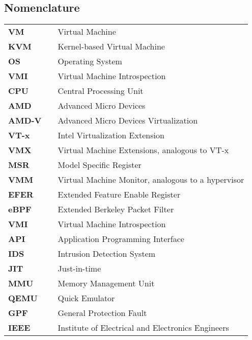 \documentclass{report}
\begin{document}
\begin{spacing}{1.5}
{}
\lstlistoflistings




\chapter*{Nomenclature}

\begin{longtable}{lcl}
\large{\bf VM}  & & \large{Virtual Machine} \\
\large{\bf KVM}  & & \large{Kernel-based Virtual Machine} \\
\large{\bf OS}   & & \large{Operating System}        \\
\large{\bf VMI}  & & \large{Virtual Machine Introspection} \\
\large{\bf CPU}  & & \large{Central Processing Unit} \\
\large{\bf AMD}  & & \large{Advanced Micro Devices} \\
\large{\bf AMD-V}  & & \large{Advanced Micro Devices Virtualization} \\
\large{\bf VT-x}  & & \large{Intel Virtualization Extension} \\
\large{\bf VMX}  & & \large{Virtual Machine Extensions, analogous to VT-x} \\
\large{\bf MSR}  & & \large{Model Specific Register} \\
\large{\bf VMM}  & & \large{Virtual Machine Monitor, analogous to a hypervisor} \\
\large{\bf EFER}  & & \large{Extended Feature Enable Register} \\
\large{\bf eBPF}  & & \large{Extended Berkeley Packet Filter} \\
\large{\bf VMI}  & & \large{Virtual Machine Introspection} \\
\large{\bf API}  & & \large{Application Programming Interface} \\
\large{\bf IDS}  & & \large{Intrusion Detection System} \\
\large{\bf JIT}  & & \large{Just-in-time} \\
\large{\bf MMU}  & & \large{Memory Management Unit} \\
\large{\bf QEMU}  & & \large{Quick Emulator} \\
\large{\bf GPF}  & & \large{General Protection Fault} \\
\large{\bf IEEE}  & & \large{Institute of Electrical and Electronics Engineers} \\

\end{longtable}
\end{spacing}
\end{document}
